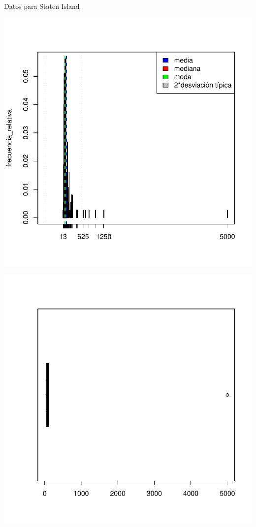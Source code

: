 \documentclass [a4paper] {article}
\begin{document}
Datos para Staten Island
\begin{center}
\includegraphics{entrega-043}
\end{center}
\begin{center}
\includegraphics{entrega-044}
\end{center}
\end{document}
